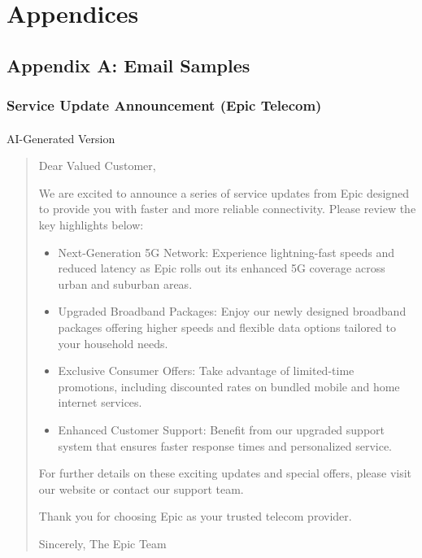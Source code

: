 \documentclass[
]{article}
\makeatletter
\let\oldparagraph\paragraph
\renewcommand{\paragraph}{
    \@ifstar
      \xxxParagraphStar
      \xxxParagraphNoStar
  }
\newcommand{\xxxParagraphStar}[1]{\oldparagraph*{#1}\mbox{}}
\newcommand{\xxxParagraphNoStar}[1]{\oldparagraph{#1}\mbox{}}
\providecommand{\tightlist}{%
  \setlength{\itemsep}{0pt}\setlength{\parskip}{0pt}}\usepackage{longtable,booktabs,array}
\makeatother
\begin{document}
\section{Appendices}\label{appendices}

\subsection{Appendix A: Email Samples}\label{appendix-a-email-samples}

\subsubsection{Service Update Announcement (Epic
Telecom)}\label{service-update-announcement-epic-telecom}

\paragraph{AI-Generated Version}\label{ai-generated-version}

\begin{quote}
Dear Valued Customer,

We are excited to announce a series of service updates from Epic
designed to provide you with faster and more reliable connectivity.
Please review the key highlights below:

\begin{itemize}
\tightlist
\item
  Next-Generation 5G Network: Experience lightning-fast speeds and
  reduced latency as Epic rolls out its enhanced 5G coverage across
  urban and suburban areas.
\item
  Upgraded Broadband Packages: Enjoy our newly designed broadband
  packages offering higher speeds and flexible data options tailored to
  your household needs.
\item
  Exclusive Consumer Offers: Take advantage of limited-time promotions,
  including discounted rates on bundled mobile and home internet
  services.
\item
  Enhanced Customer Support: Benefit from our upgraded support system
  that ensures faster response times and personalized service.
\end{itemize}

For further details on these exciting updates and special offers, please
visit our website or contact our support team.

Thank you for choosing Epic as your trusted telecom provider.

Sincerely, The Epic Team
\end{quote}
\end{document}
